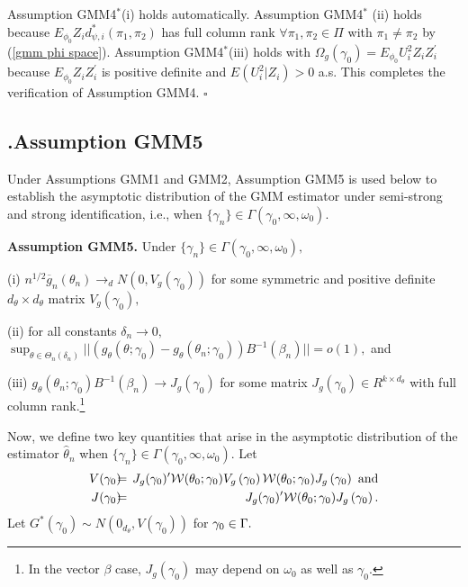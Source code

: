\documentclass[12pt,thmsb,titlepage,final,oneside,letterpaper]{article}
\begin{document}
Assumption GMM4$^{\ast }$(i) holds automatically. Assumption GMM4$^{\ast }$%
(ii) holds because $E_{\phi _{0}}Z_{i}d_{\psi ,i}^{\ast }(\pi _{1},\pi _{2})$
has full column rank $\forall \pi _{1},\pi _{2}\in \Pi $ with $\pi _{1}\neq
\pi _{2}$ by (\ref{gmm phi space}). Assumption GMM4$^{\ast }$(iii) holds
with $\Omega _{g}(\gamma _{0})=E_{\phi _{0}}U_{i}^{2}Z_{i}Z_{i}^{\prime }$
because $E_{\phi _{0}}Z_{i}Z_{i}^{\prime }$ is positive definite and $%
E(U_{i}^{2}|Z_{i})>0$ a.s. This completes the verification of Assumption
GMM4. $\square $

\subsection{\hspace{-0.23in}\textbf{.}\hspace{0.18in}Assumption GMM5}

\hspace{0.25in}Under Assumptions GMM1 and GMM2, Assumption GMM5 is used
below to establish the asymptotic distribution of the GMM estimator under
semi-strong and strong identification, i.e., when $\{\gamma _{n}\}\in \Gamma
(\gamma _{0},\infty ,\omega _{0}).$\medskip

\noindent \textbf{Assumption GMM5. }Under $\{\gamma _{n}\}\in \Gamma (\gamma
_{0},\infty ,\omega _{0}),$

\noindent (i) $n^{1/2}\overline{g}_{n}(\theta _{n})\rightarrow
_{d}N(0,V_{g}(\gamma _{0}))$ for some symmetric and positive definite $%
d_{\theta }\times d_{\theta }$ matrix $V_{g}(\gamma _{0}),$

\noindent (ii) for all constants $\delta _{n}\rightarrow 0,$ $\sup_{\theta
\in \Theta _{n}\left( \delta _{n}\right) }||(g_{\theta }(\theta ;\gamma
_{0})-g_{\theta }(\theta _{n};\gamma _{0}))B^{-1}(\beta _{n})||=o(1),$ and

\noindent (iii) $g_{\theta }(\theta _{n};\gamma _{0})B^{-1}(\beta
_{n})\rightarrow J_{g}(\gamma _{0})$ for some matrix $J_{g}(\gamma _{0})\in
R^{k\times d_{\theta }}$ with full column rank.\footnote{%
In the vector $\beta $ case, $J_{g}(\gamma _{0})$ may depend on $\omega _{0}$
as well as $\gamma _{0}.$}\medskip

Now, we define two key quantities that arise in the asymptotic distribution
of the estimator $\widehat{\theta }_{n}$ when $\{\gamma _{n}\}\in \Gamma
(\gamma _{0},\infty ,\omega _{0}).$ Let%
\begin{eqnarray}
V(\gamma _{0})\hspace{-0.08in} &=&\hspace{-0.08in}J_{g}(\gamma _{0})^{\prime
}\mathcal{W}(\theta _{0};\gamma _{0})V_{g}\left( \gamma _{0}\right) \mathcal{%
W}(\theta _{0};\gamma _{0})J_{g}\left( \gamma _{0}\right) \text{ and}  \notag
\\
J(\gamma _{0})\hspace{-0.08in} &=&\hspace{-0.08in}J_{g}(\gamma _{0})^{\prime
}\mathcal{W}(\theta _{0};\gamma _{0})J_{g}\left( \gamma _{0}\right) .
\label{J and V Matrices}
\end{eqnarray}%
Let $G^{\ast }(\gamma _{0})\sim N(0_{d_{\theta }},V(\gamma _{0}))$ for $%
\gamma _{0}\in \Gamma .\medskip $
\end{document}
